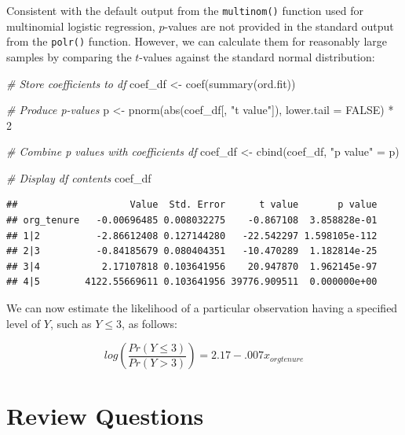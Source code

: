 \documentclass[
]{book}
\newenvironment{Shaded}{\begin{snugshade}}{\end{snugshade}}
\newcommand{\AttributeTok}[1]{\textcolor[rgb]{0.77,0.63,0.00}{#1}}
\newcommand{\CommentTok}[1]{\textcolor[rgb]{0.56,0.35,0.01}{\textit{#1}}}
\newcommand{\ConstantTok}[1]{\textcolor[rgb]{0.00,0.00,0.00}{#1}}
\newcommand{\DecValTok}[1]{\textcolor[rgb]{0.00,0.00,0.81}{#1}}
\newcommand{\FunctionTok}[1]{\textcolor[rgb]{0.00,0.00,0.00}{#1}}
\newcommand{\NormalTok}[1]{#1}
\newcommand{\OtherTok}[1]{\textcolor[rgb]{0.56,0.35,0.01}{#1}}
\newcommand{\SpecialCharTok}[1]{\textcolor[rgb]{0.00,0.00,0.00}{#1}}
\newcommand{\StringTok}[1]{\textcolor[rgb]{0.31,0.60,0.02}{#1}}
\begin{document}
Consistent with the default output from the \texttt{multinom()} function used for multinomial logistic regression, \(p\)-values are not provided in the standard output from the \texttt{polr()} function. However, we can calculate them for reasonably large samples by comparing the \(t\)-values against the standard normal distribution:

\begin{Shaded}
\begin{Highlighting}[]
\CommentTok{\# Store coefficients to df}
\NormalTok{coef\_df }\OtherTok{\textless{}{-}} \FunctionTok{coef}\NormalTok{(}\FunctionTok{summary}\NormalTok{(ord.fit))}

\CommentTok{\# Produce p{-}values}
\NormalTok{p }\OtherTok{\textless{}{-}} \FunctionTok{pnorm}\NormalTok{(}\FunctionTok{abs}\NormalTok{(coef\_df[, }\StringTok{"t value"}\NormalTok{]), }\AttributeTok{lower.tail =} \ConstantTok{FALSE}\NormalTok{) }\SpecialCharTok{*} \DecValTok{2}

\CommentTok{\# Combine p values with coefficients df}
\NormalTok{coef\_df }\OtherTok{\textless{}{-}} \FunctionTok{cbind}\NormalTok{(coef\_df, }\StringTok{"p value"} \OtherTok{=}\NormalTok{ p)}

\CommentTok{\# Display df contents}
\NormalTok{coef\_df}
\end{Highlighting}
\end{Shaded}

\begin{verbatim}
##                    Value  Std. Error      t value       p value
## org_tenure   -0.00696485 0.008032275    -0.867108  3.858828e-01
## 1|2          -2.86612408 0.127144280   -22.542297 1.598105e-112
## 2|3          -0.84185679 0.080404351   -10.470289  1.182814e-25
## 3|4           2.17107818 0.103641956    20.947870  1.962145e-97
## 4|5        4122.55669611 0.103641956 39776.909511  0.000000e+00
\end{verbatim}

We can now estimate the likelihood of a particular observation having a specified level of \(Y\), such as \(Y \le 3\), as follows:

\[ log(\frac{Pr(Y \le 3)} {Pr(Y > 3)}) =  2.17 - .007 x_{orgtenure} \]

\hypertarget{review-questions-9}{%
\section{Review Questions}\label{review-questions-9}}
\end{document}
